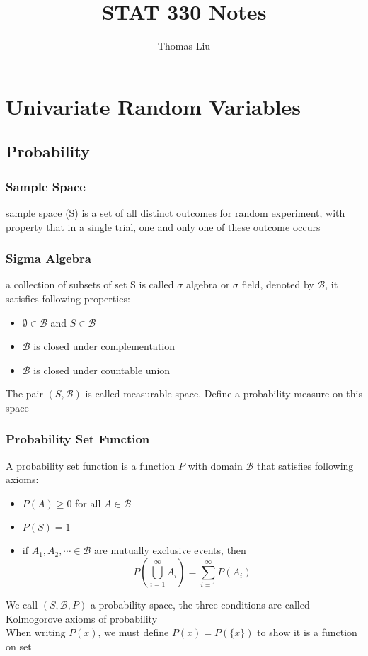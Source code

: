 \documentclass[11pt]{article}
\title{STAT 330 Notes}
\author{Thomas Liu}
\newcommand{\mB}{\mathcal{B}}
\begin{document}
\maketitle
\tableofcontents

\newpage 
\section{Univariate Random Variables}
\subsection{Probability}
\subsubsection{Sample Space}
sample space (S) is a set of all distinct outcomes for random experiment, with property that in a single trial,
one and only one of these outcome occurs 
\subsubsection{Sigma Algebra}
a collection of subsets of set S is called $\sigma$ algebra or $\sigma$ field, denoted by $\mB$, it satisfies following properties:
\begin{itemize}
    \item $\emptyset\in\mB$ and $S\in\mB$
    \item $\mB$ is closed under complementation
    \item $\mB$ is closed under countable union
\end{itemize}
The pair $(S,\mB)$ is called measurable space. Define a probability measure on this space 
\subsubsection{Probability Set Function}
A probability set function is a function $P$ with domain $\mB$ that satisfies following axioms:
\begin{itemize}
    \item $P(A)\geq0$ for all $A\in\mB$
    \item $P(S)=1$
    \item if $A_1,A_2,\cdots\in\mB$ are mutually exclusive events, then \[P(\bigcup_{i=1}^{\infty}A_i) = \sum_{i=1}^{\infty}P(A_i)\]
\end{itemize}
We call $(S,\mB,P)$ a probability space, the three conditions are called Kolmogorove axioms of probability \\
When writing $P(x)$, we must define $P(x)=P(\{x\})$ to show it is a function on set 
\end{document}
